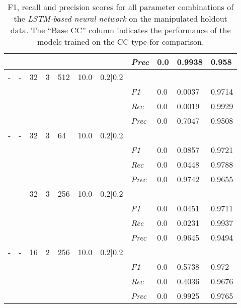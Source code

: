 \begin{table}[H]
\begin{tabularx}{\textwidth}{XXXXXXX|X|X|X|X}
    & & & & & & & \textit{Prec} & 0.0 & 0.9938 & 0.958 \\ \midrule
    - & - & 32 & 3 & 512 &10.0 & 0.2|0.2 & & & & \\
    & & & & & & & \textit{F1} & 0.0 & 0.0037 & 0.9714       \\
    & & & & & & & \textit{Rec} &  0.0 & 0.0019  & 0.9929  \\
    & & & & & & & \textit{Prec} & 0.0 & 0.7047 & 0.9508 \\ \midrule
    - & - & 32 & 3 & 64 &10.0 & 0.2|0.2 & & & & \\
    & & & & & & & \textit{F1} & 0.0 & 0.0857 & 0.9721       \\
    & & & & & & & \textit{Rec} &  0.0 & 0.0448  & 0.9788  \\
    & & & & & & & \textit{Prec} & 0.0 & 0.9742 & 0.9655 \\ \midrule
    - & - & 32 & 3 & 256 &10.0 & 0.2|0.2 & & & & \\
    & & & & & & & \textit{F1} & 0.0 & 0.0451 & 0.9711       \\
    & & & & & & & \textit{Rec} &  0.0 & 0.0231  & 0.9937  \\
    & & & & & & & \textit{Prec} & 0.0 & 0.9645 & 0.9494 \\ \midrule
    - & - & 16 & 2 & 256 &10.0 & 0.2|0.2 & & & & \\
    & & & & & & & \textit{F1} & 0.0 & 0.5738 & 0.972       \\
    & & & & & & & \textit{Rec} &  0.0 & 0.4036  & 0.9676  \\
    & & & & & & & \textit{Prec} & 0.0 & 0.9925 & 0.9765 \\ \midrule
    \end{tabularx}
    \caption{F1, recall and precision scores for all parameter combinations of the \textit{LSTM-based neural network} on the manipulated holdout data. The \enquote{Base CC} column indicates the performance of the models trained on the CC type for comparison. }
    \label{tab:rq3_lstm}
    \end{table}